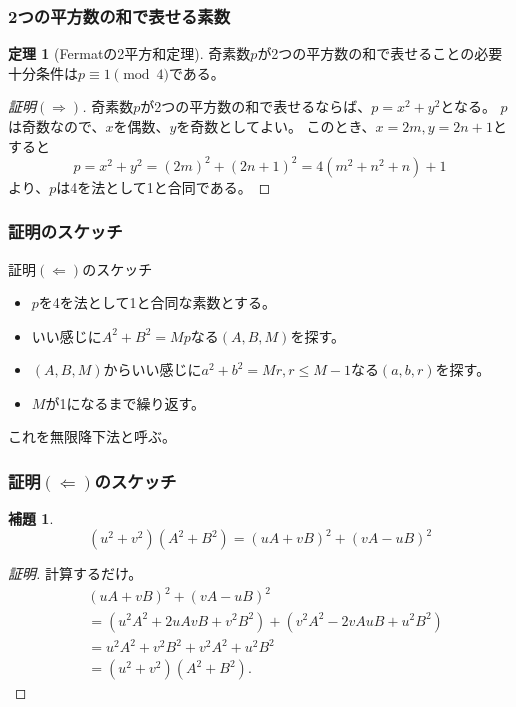 \documentclass[dvipdfmx,11pt,notheorems]{beamer}
\theoremstyle{definition}
\newtheorem{theorem}{定理}
\newtheorem{lemma}{補題}
\begin{document}
\begin{frame}\frametitle{2つの平方数の和で表せる素数}

\begin{theorem}[Fermatの2平方和定理]
奇素数$p$が2つの平方数の和で表せることの必要十分条件は$p \equiv 1 \pmod{4}$である。
\end{theorem}

\begin{proof}[証明$(\Rightarrow)$]
奇素数$p$が2つの平方数の和で表せるならば、$p=x^{2}+y^{2}$となる。
$p$は奇数なので、$x$を偶数、$y$を奇数としてよい。
このとき、$x=2m, y=2n+1$とすると
\begin{equation*}
p = x^{2}+y^{2} = (2m)^{2} + (2n + 1)^{2} = 4(m^{2} + n^{2} + n) + 1
\end{equation*}
より、$p$は4を法として1と合同である。

\end{proof}

\end{frame}

\begin{frame}\frametitle{証明のスケッチ}

\begin{block}{証明$(\Leftarrow)$のスケッチ}

\begin{itemize}
\item $p$を4を法として1と合同な素数とする。
\item いい感じに$A^{2}+B^{2} = Mp$なる$(A, B, M)$を探す。
\item $(A, B, M)$からいい感じに$a^{2}+b^{2}=Mr, r \leq M-1$なる$(a, b, r)$を探す。
\item $M$が1になるまで繰り返す。
\end{itemize}

\end{block}
これを無限降下法と呼ぶ。
\end{frame}

\begin{frame}\frametitle{証明$(\Leftarrow)$のスケッチ}

\begin{lemma}
\begin{equation*}
(u^{2} + v^{2})(A^{2}+B^{2}) = (uA+vB)^{2} + (vA-uB)^{2}
\end{equation*}
\end{lemma}

\begin{proof}[証明]
計算するだけ。
\begin{equation*} 
\begin{split}
&(uA+vB)^{2} + (vA-uB)^{2}  \\
&= (u^{2}A^{2} + 2uAvB + v^{2}B^{2}) + (v^{2}A^{2}-2vAuB + u^{2}B^{2})  \\
 &= u^{2}A^{2}+v^{2}B^{2} + v^{2}A^{2}+u^{2}B^{2} \\
 &= (u^{2} + v^{2})(A^{2}+B^{2}).
 \end{split}
\end{equation*}

\end{proof}

\end{frame}
\end{document}
